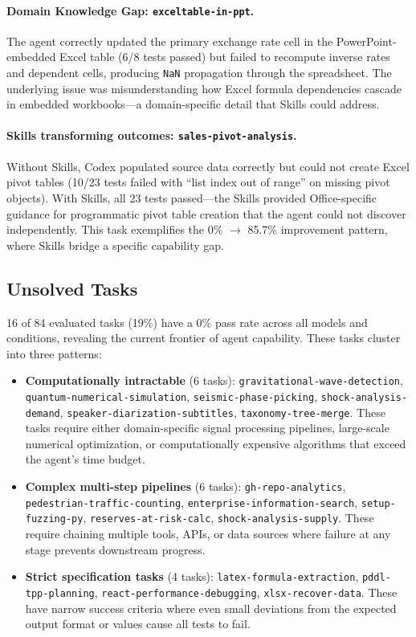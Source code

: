 \paragraph{Domain Knowledge Gap: \texttt{exceltable-in-ppt}.}
The agent correctly updated the primary exchange rate cell in the PowerPoint-embedded Excel table (6/8 tests passed) but failed to recompute inverse rates and dependent cells, producing \texttt{NaN} propagation through the spreadsheet. The underlying issue was misunderstanding how Excel formula dependencies cascade in embedded workbooks---a domain-specific detail that Skills could address.

\paragraph{Skills transforming outcomes: \texttt{sales-pivot-analysis}.}
Without Skills, Codex populated source data correctly but could not create Excel pivot tables (10/23 tests failed with ``list index out of range'' on missing pivot objects). With Skills, all 23 tests passed---the Skills provided Office-specific guidance for programmatic pivot table creation that the agent could not discover independently. This task exemplifies the 0\% $\to$ 85.7\% improvement pattern, where Skills bridge a specific capability gap.

\subsection{Unsolved Tasks}
\label{app:unsolved-tasks}

16 of 84 evaluated tasks (19\%) have a 0\% pass rate across all models and conditions, revealing the current frontier of agent capability. These tasks cluster into three patterns:

\begin{itemize}[nosep]
\item \textbf{Computationally intractable} (6 tasks): \texttt{gravitational-wave-detection}, \texttt{quantum-numerical-simulation}, \texttt{seismic-phase-picking}, \texttt{shock-analysis-demand}, \texttt{speaker-diarization-subtitles}, \texttt{taxonomy-tree-merge}. These tasks require either domain-specific signal processing pipelines, large-scale numerical optimization, or computationally expensive algorithms that exceed the agent's time budget.
\item \textbf{Complex multi-step pipelines} (6 tasks): \texttt{gh-repo-analytics}, \texttt{pedestrian-traffic-counting}, \texttt{enterprise-information-search}, \texttt{setup-fuzzing-py}, \texttt{reserves-at-risk-calc}, \texttt{shock-analysis-supply}. These require chaining multiple tools, APIs, or data sources where failure at any stage prevents downstream progress.
\item \textbf{Strict specification tasks} (4 tasks): \texttt{latex-formula-extraction}, \texttt{pddl-tpp-planning}, \texttt{react-performance-debugging}, \texttt{xlsx-recover-data}. These have narrow success criteria where even small deviations from the expected output format or values cause all tests to fail.
\end{itemize}

